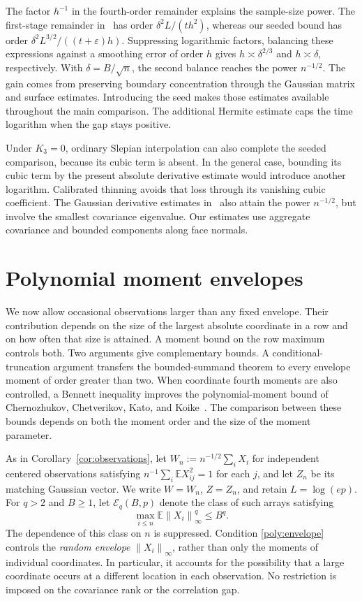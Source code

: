 \documentclass[11pt,letterpaper]{article}
\theoremstyle{remark}
\newcommand{\E}{\mathbb E}
\newcommand{\norm}[1]{\left\lVert#1\right\rVert}
\begin{document}
The factor \(h^{-1}\) in the fourth-order remainder explains the
sample-size power. The first-stage remainder in~\cite[Proposition~2]{GaoZhang}
has order \(\delta^2L/(th^2)\), whereas our seeded bound has order
\(\delta^2L^{3/2}/((t+\varepsilon)h)\). Suppressing logarithmic
factors, balancing these expressions against a smoothing error of
order \(h\) gives \(h\asymp\delta^{2/3}\) and
\(h\asymp\delta\), respectively. With \(\delta=B/\sqrt n\),
the second balance reaches the power \(n^{-1/2}\). The gain comes
from preserving boundary concentration through the Gaussian matrix
and surface estimates. Introducing the seed makes those estimates
available throughout the main comparison. The additional Hermite
estimate caps the time logarithm when the gap stays positive.

Under \(K_3=0\), ordinary Slepian interpolation can also complete
the seeded comparison, because its cubic term is absent. In the
general case, bounding its cubic term by the present absolute
derivative estimate would introduce another logarithm. Calibrated
thinning avoids that loss through its vanishing cubic coefficient.
The Gaussian derivative estimates in~\cite{AL} also attain the
power \(n^{-1/2}\), but involve the smallest covariance eigenvalue.
Our estimates use aggregate covariance and bounded
components along face normals.


\section{Polynomial moment envelopes}\label{sec:poly}

We now allow occasional observations larger than any fixed envelope.
Their contribution depends on the size of the largest absolute
coordinate in a row and on how often that size is attained. A moment
bound on the row maximum controls both. Two arguments give complementary bounds. A
conditional-truncation argument transfers the bounded-summand theorem
to every envelope moment of order greater than two. When coordinate
fourth moments are also controlled, a Bennett inequality improves the
polynomial-moment bound of Chernozhukov, Chetverikov, Kato, and
Koike~\cite{CCKK2022}. The comparison between these bounds depends on
both the moment order and the size of the moment parameter.

As in Corollary~\ref{cor:observations}, let \(W_n:=n^{-1/2}\sum_iX_i\)
for independent centered observations satisfying
\(n^{-1}\sum_i\E X_{ij}^2=1\) for each \(j\), and let \(Z_n\) be its matching Gaussian vector. We write
\(W=W_n\), \(Z=Z_n\), and retain \(L=\log(ep)\).
For \(q>2\) and \(B\ge1\), let \(\mathcal E_q(B,p)\) denote the class
of such arrays satisfying
\begin{equation}
 \max_{i\le n}\E\norm{X_i}_\infty^q\le B^q.
 \label{poly:envelope}
\end{equation}
The dependence of this class on \(n\) is suppressed. Condition
\eqref{poly:envelope} controls the \emph{random envelope}
\(\norm{X_i}_\infty\), rather than only the moments of individual
coordinates. In particular, it accounts for the possibility that a
large coordinate occurs at a different location in each observation.
No restriction is imposed on the covariance rank or the correlation gap.
\end{document}

